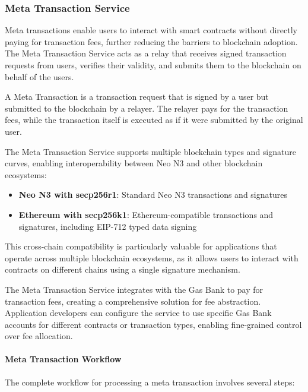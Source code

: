\subsubsection{Meta Transaction Service}
\label{subsubsec:meta-tx}

Meta transactions enable users to interact with smart contracts without directly paying for transaction fees, further reducing the barriers to blockchain adoption. The Meta Transaction Service acts as a relay that receives signed transaction requests from users, verifies their validity, and submits them to the blockchain on behalf of the users.



\begin{definition}
A Meta Transaction is a transaction request that is signed by a user but submitted to the blockchain by a relayer. The relayer pays for the transaction fees, while the transaction itself is executed as if it were submitted by the original user.
\end{definition}

The Meta Transaction Service supports multiple blockchain types and signature curves, enabling interoperability between Neo N3 and other blockchain ecosystems:

\begin{itemize}
    \item \textbf{Neo N3 with secp256r1}: Standard Neo N3 transactions and signatures
    \item \textbf{Ethereum with secp256k1}: Ethereum-compatible transactions and signatures, including EIP-712 typed data signing
\end{itemize}

This cross-chain compatibility is particularly valuable for applications that operate across multiple blockchain ecosystems, as it allows users to interact with contracts on different chains using a single signature mechanism.

The Meta Transaction Service integrates with the Gas Bank to pay for transaction fees, creating a comprehensive solution for fee abstraction. Application developers can configure the service to use specific Gas Bank accounts for different contracts or transaction types, enabling fine-grained control over fee allocation.



\paragraph{Meta Transaction Workflow}
The complete workflow for processing a meta transaction involves several steps:

